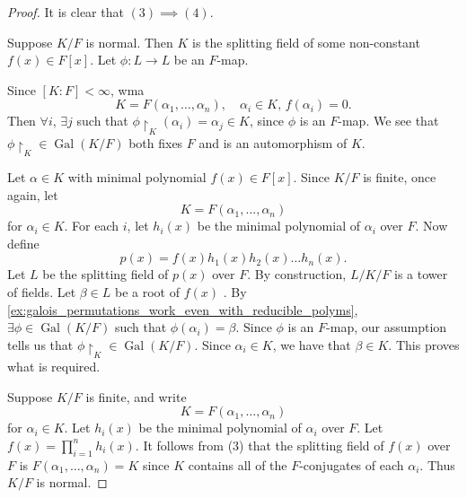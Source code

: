 \documentclass[notoc,notitlepage]{tufte-book}
\DeclareMathOperator{\Gal}{Gal}
\begin{document}
\begin{proof}
  It is clear that $(3) \implies (4)$.

  \noindent
   Suppose $K / F$ is normal. Then $K$ is the
  splitting field of some non-constant $f(x) \in F[x]$. Let $\phi : L \to L$ be
  an $F$-map.

  Since $[ K : F ] < \infty$, wma
  \begin{equation*}
    K = F(\alpha_1, \ldots, \alpha_n), \quad \alpha_i \in K, \, f(\alpha_i) = 0.
  \end{equation*}
  Then $\forall i$, $\exists j$ such that $\phi \restriction_K (\alpha_i) =
  \alpha_j \in K$, since $\phi$ is an $F$-map. We see that $\phi \restriction_K
  \in \Gal(K / F)$ both fixes $F$ and is an automorphism of $K$.

  \noindent
   Let $\alpha \in K$ with minimal polynomial $f(x)
  \in F[x]$. Since $K / F$ is finite, once again, let
  \begin{equation*}
    K = F(\alpha_1, \ldots, \alpha_n)
  \end{equation*}
  for $\alpha_i \in K$. For each $i$, let $h_i(x)$ be the minimal polynomial of
  $\alpha_i$ over $F$. Now define 
  \begin{equation*}
    p(x) = f(x) h_1(x) h_2(x) \hdots h_n(x).
  \end{equation*}
  Let $L$ be the splitting field of $p(x)$ over $F$. By construction, $L / K /
  F$ is a tower of fields. Let $\beta \in L$ be a root of $f(x)$ . By
  \cref{ex:galois_permutations_work_even_with_reducible_polyms}, $\exists \phi
  \in \Gal(K / F)$ such that $\phi(\alpha_i) = \beta$. Since $\phi$ is an
  $F$-map, our assumption tells us that $\phi \restriction_K \in \Gal(K / F)$.
  Since $\alpha_i \in K$, we have that $\beta \in K$. This proves what is
  required.

  \noindent
   Suppose $K / F$ is finite, and write
  \begin{equation*}
    K = F(\alpha_1, \ldots, \alpha_n)
  \end{equation*}
  for $\alpha_i \in K$. Let $h_i(x)$ be the minimal polynomial of $\alpha_i$
  over $F$. Let $f(x) = \prod_{i=1}^{n} h_i(x)$. It follows from (3) that the
  splitting field of $f(x)$ over $F$ is $F(\alpha_1, \ldots, \alpha_n) = K$
  since $K$ contains all of the $F$-conjugates of each $\alpha_i$. Thus $K / F$
  is normal.
\end{proof}
\end{document}
